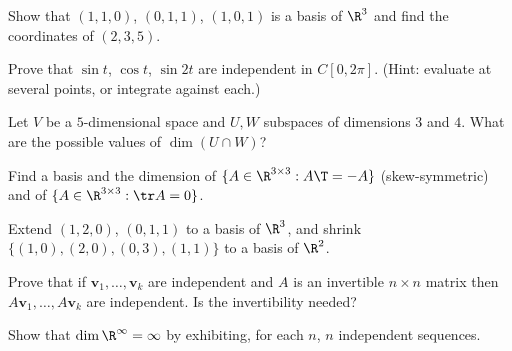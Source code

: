 \begin{exercise}
Show that $(1,1,0)$, $(0,1,1)$, $(1,0,1)$ is a basis of $\R^3$ and find the coordinates of $(2,3,5)$.
\end{exercise}

\begin{exercise}
Prove that $\sin t$, $\cos t$, $\sin 2t$ are independent in $C[0,2\pi]$. (Hint: evaluate at several points, or integrate against each.)
\end{exercise}

\begin{exercise}
Let $V$ be a $5$-dimensional space and $U,W$ subspaces of dimensions $3$ and $4$. What are the possible values of $\dim(U\cap W)$?
\end{exercise}

\begin{exercise}
Find a basis and the dimension of $\{A\in\R^{3\times3}: A\T=-A\}$ (skew-symmetric) and of $\{A\in\R^{3\times3}:\tr A=0\}$.
\end{exercise}

\begin{exercise}
Extend $(1,2,0)$, $(0,1,1)$ to a basis of $\R^3$, and shrink $\{(1,0),(2,0),(0,3),(1,1)\}$ to a basis of $\R^2$.
\end{exercise}

\begin{exercise}
Prove that if $\mathbf{v}_1,\dots,\mathbf{v}_k$ are independent and $A$ is an invertible $n\times n$ matrix then $A\mathbf{v}_1,\dots,A\mathbf{v}_k$ are independent. Is the invertibility needed?
\end{exercise}

\begin{exercise}
Show that $\dim\R^\infty=\infty$ by exhibiting, for each $n$, $n$ independent sequences.
\end{exercise}
